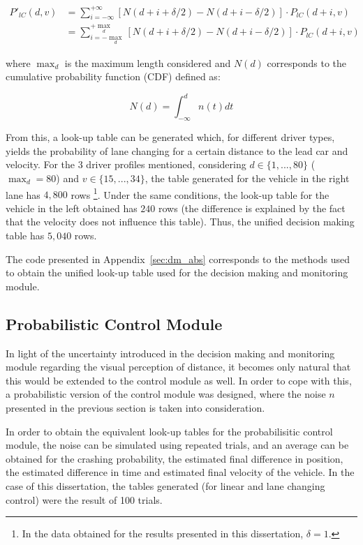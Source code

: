 \begin{equation}
\begin{aligned}
	P'_{lC}(d,v) & = \sum_{i = -\infty}^{+\infty} [N(d + i + \delta/2) - N(d + i - \delta/2)] \cdot P_{lC}(d + i,v) \\
	& = \sum_{i = -\max_d}^{+\max_d} [N(d + i + \delta/2) - N(d + i - \delta/2)] \cdot P_{lC}(d + i,v)
\end{aligned}
\end{equation}

where $\max_d$ is the maximum length considered and $N(d)$ corresponds to the cumulative probability function (CDF) defined as:

\begin{equation}
	N(d) = \int_{-\infty}^d n(t) dt
\end{equation}

From this, a look-up table can be generated which, for different driver types, yields the probability of lane changing for a certain distance to the lead car and velocity. For the 3 driver profiles mentioned, considering $d \in \{1,...,80\}$ ($\max_d = 80$) and $v \in \{15,...,34\}$, the table generated for the vehicle in the right lane has $4,800$ rows \footnote{In the data obtained for the results presented in this dissertation, $\delta = 1$.}. Under the same conditions, the look-up table for the vehicle in the left obtained has $240$ rows (the difference is explained by the fact that the velocity does not influence this table). Thus, the unified decision making table has $5,040$ rows.

The code presented in Appendix~\ref{sec:dm_abs} corresponds to the methods used to obtain the unified look-up table used for the decision making and monitoring module.

\subsection{Probabilistic Control Module}
\label{sec:prob_control}

In light of the uncertainty introduced in the decision making and monitoring module regarding the visual perception of distance, it becomes only natural that this would be extended to the control module as well. In order to cope with this, a probabilistic version of the control module was designed, where the noise $n$ presented in the previous section is taken into consideration. 

In order to obtain the equivalent look-up tables for the probabilisitic control module, the noise can be simulated using repeated trials, and an average can be obtained for the crashing probability, the estimated final difference in position, the estimated difference in time and estimated final velocity of the vehicle. In the case of this dissertation, the tables generated (for linear and lane changing control) were the result of 100 trials.

